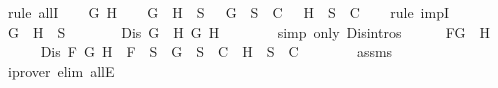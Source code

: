 \begin{isabellebody}
%
\isadelimproof
%
\endisadelimproof
%
\isatagproof
{}\isamarkupfalse%
\ {\isacharparenleft}rule\ allI{\isacharparenright}{\isacharplus}\isanewline
\ \ \isamarkupfalse%
\ G\ H\isanewline
\ \ \isamarkupfalse%
\ {\isachardoublequoteopen}\isactrlbold {\isasymnot}{\isacharparenleft}G\ \isactrlbold {\isasymand}\ H{\isacharparenright}\ {\isasymin}\ S\ {\isasymlongrightarrow}\ {\isacharbraceleft}\isactrlbold {\isasymnot}\ G{\isacharbraceright}\ {\isasymunion}\ S\ {\isasymin}\ C\ {\isasymor}\ {\isacharbraceleft}\isactrlbold {\isasymnot}\ H{\isacharbraceright}\ {\isasymunion}\ S\ {\isasymin}\ C{\isachardoublequoteclose}\isanewline
\ \ \isamarkupfalse%
\ {\isacharparenleft}rule\ impI{\isacharparenright}\isanewline
\ \ \ \ \isamarkupfalse%
\ {\isachardoublequoteopen}\isactrlbold {\isasymnot}{\isacharparenleft}G\ \isactrlbold {\isasymand}\ H{\isacharparenright}\ {\isasymin}\ S{\isachardoublequoteclose}\isanewline
\ \ \ \ \isamarkupfalse%
\ \isamarkupfalse%
\ {\isachardoublequoteopen}Dis\ {\isacharparenleft}\isactrlbold {\isasymnot}{\isacharparenleft}G\ \isactrlbold {\isasymand}\ H{\isacharparenright}{\isacharparenright}\ {\isacharparenleft}\isactrlbold {\isasymnot}G{\isacharparenright}\ {\isacharparenleft}\isactrlbold {\isasymnot}H{\isacharparenright}{\isachardoublequoteclose}\isanewline
\ \ \ \ \ \ \isamarkupfalse%
\ {\isacharparenleft}simp\ only{\isacharcolon}\ Dis{\isachardot}intros{\isacharparenleft}{}{\isacharparenright}{\isacharparenright}\isanewline
\ \ \ \ \isamarkupfalse%
\ {\isacharquery}F{\isacharequal}{\isachardoublequoteopen}\isactrlbold {\isasymnot}{\isacharparenleft}G\ \isactrlbold {\isasymand}\ H{\isacharparenright}{\isachardoublequoteclose}\isanewline
\ \ \ \ \isamarkupfalse%
\ {\isachardoublequoteopen}Dis\ {\isacharquery}F\ {\isacharparenleft}\isactrlbold {\isasymnot}G{\isacharparenright}\ {\isacharparenleft}\isactrlbold {\isasymnot}H{\isacharparenright}\ {\isasymlongrightarrow}\ {\isacharquery}F\ {\isasymin}\ S\ {\isasymlongrightarrow}\ {\isacharbraceleft}\isactrlbold {\isasymnot}G{\isacharbraceright}\ {\isasymunion}\ S\ {\isasymin}\ C\ {\isasymor}\ {\isacharbraceleft}\isactrlbold {\isasymnot}H{\isacharbraceright}\ {\isasymunion}\ S\ {\isasymin}\ C{\isachardoublequoteclose}\isanewline
\ \ \ \ \ \ \isamarkupfalse%
\ assms\ \isamarkupfalse%
\ {\isacharparenleft}iprover\ elim{\isacharcolon}\ allE{\isacharparenright}\isanewline
\ \ \ \ \isamarkupfalse%

\end{isabellebody}
